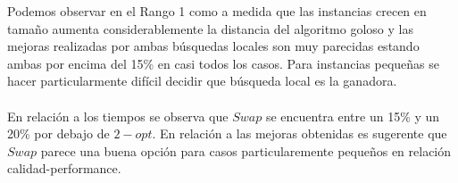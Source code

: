 Podemos observar en el Rango 1 como a medida que las instancias crecen en tamaño aumenta considerablemente la distancia del algoritmo goloso y las mejoras realizadas por ambas búsquedas locales son muy parecidas estando ambas por encima del 15\% en casi todos los casos. Para instancias pequeñas se hacer particularmente difícil decidir que búsqueda local es la ganadora. 
\\\\

En relación a los tiempos se observa que $Swap$ se encuentra entre un 15\% y un 20\% por debajo de $2-opt$. En relación a las mejoras obtenidas es sugerente que $Swap$ parece una buena opción para casos particularemente pequeños en relación calidad-performance.
\\\\

\begin{figure}[h] 
 \centering
       \label{fig:gruposDist2}
    \label{fig:gruposMejora2}
    \end{figure}
 

